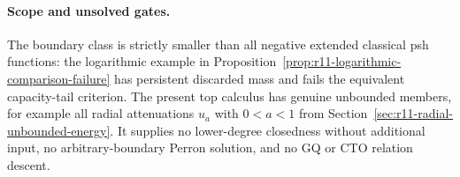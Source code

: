 \paragraph{Scope and unsolved gates.}
The boundary class is strictly smaller than all negative extended
classical psh functions: the logarithmic example in
Proposition~\ref{prop:r11-logarithmic-comparison-failure} has
persistent discarded mass and fails the equivalent capacity-tail
criterion. The present top calculus has genuine unbounded members,
for example all radial attenuations $u_a$ with $0<a<1$ from
Section~\ref{sec:r11-radial-unbounded-energy}. It supplies no lower-degree
closedness without additional input, no arbitrary-boundary Perron
solution, and no GQ or CTO relation descent.

